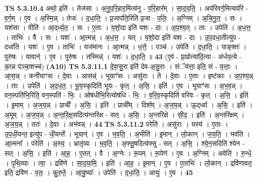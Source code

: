 \documentclass[17pt]{extarticle}
\begin{document}
                  \newline
                                \textbf{ TS 5.3.10.4} \newline
                  अथो॒ इति॑ । तेज॑सा । अ॒नु॒प॒रि॒हार॒मित्य॑नु - प॒रि॒हार᳚म् । सा॒द॒य॒ति॒ । अप॑रिवर्ग॒मित्यप॑रि - व॒र्ग॒म् । ए॒व । अ॒स्मि॒न्न् । तेजः॑ । द॒धा॒ति॒ । प्र॒जाप॑ति॒रिति॑ प्र॒जा - प॒तिः॒ । अ॒ग्निम् । अ॒चि॒नु॒त॒ । सः । यश॑सा । वीति॑ । आ॒द्‌र्ध्य॒त॒ । सः । ए॒ताः । य॒शो॒दा इति॑ यशः - दाः । अ॒प॒श्य॒त् । ताः । उपेति॑ । अ॒ध॒त्त॒ । ताभिः॑ । वै । सः । यशः॑ । आ॒त्मन्न् । अ॒ध॒त्त॒ । यत् । य॒शो॒दा इति॑ यशः - दाः । उ॒प॒दधा॒तीत्यु॑प - दधा॑ति । यशः॑ । ए॒व । ताभिः॑ । यज॑मानः । आ॒त्मन्न् । ध॒त्ते॒ । पञ्च॑ । उपेति॑ । द॒धा॒ति॒ । पाङ्क्तः॑ । पुरु॑षः । यावान्॑ । ए॒व । पुरु॑षः । तस्मिन्न्॑ । यशः॑ । द॒धा॒ति॒ ॥ \textbf{  43} \newline
                  \newline
                      (ए॒वं - प्रा॒प्रोत्या॑दि॒त्या - अ॑र्धय॒त्ये - का॒न्न प॑ञ्चा॒शच्च॑)  \textbf{(A10)} \newline \newline
                                \textbf{ TS 5.3.11.1} \newline
                  दे॒वा॒सु॒रा इति॑ देव-अ॒सु॒राः । संॅय॑त्ता॒ इति॒ सं - य॒त्ताः॒ । आ॒स॒न्न् । कनी॑याꣳसः । दे॒वाः । आसन्न्॑ । भूयाꣳ॑सः । असु॑राः । ते । दे॒वाः । ए॒ताः । इष्ट॑काः । अ॒प॒श्य॒न्न् । ताः । उपेति॑ । अ॒द॒ध॒त॒ । भू॒य॒स्कृदिति॑ भूयः - कृत् । अ॒सि॒ । इति॑ । ए॒व । भूयाꣳ॑सः । अ॒भ॒व॒न्न् । वन॒स्पति॑भि॒रिति॒ वन॒स्पति॑ - भिः॒ । ओष॑धीभि॒रित्योष॑धि - भिः॒ । व॒रि॒व॒स्कृदिति॑ वरिवः - कृत् । अ॒सि॒ । इति॑ । इ॒माम् । अ॒ज॒य॒न्न् । प्राची᳚ । अ॒सि॒ । इति॑ । प्राची᳚म् । दिश᳚म् । अ॒ज॒य॒न्न् । ऊ॒द्‌र्ध्वा । अ॒सि॒ । इति॑ । अ॒मूम् । अ॒ज॒य॒न्न् । अ॒न्त॒रि॒क्ष॒सदित्य॑न्तरिक्ष - सत् । अ॒सि॒ । अ॒न्तरि॑क्षे । सी॒द॒ । इति॑ । अ॒न्तरि॑क्षम् । अ॒ज॒य॒न्न् । ततः॑ । दे॒वाः । अभ॑वन्न् । \textbf{  44} \newline
                  \newline
                                \textbf{ TS 5.3.11.2} \newline
                  परेति॑ । असु॑राः । यस्य॑ । ए॒ताः । उ॒प॒धी॒यन्त॒ इत्यु॑प - धी॒यन्ते᳚ । भूयान्॑ । ए॒व । भ॒व॒ति॒ । अ॒भीति॑ । इ॒मान् । लो॒कान् । ज॒य॒ति॒ । भव॑ति । आ॒त्मना᳚ । परेति॑ । अ॒स्य॒ । भ्रातृ॑व्यः । भ॒व॒ति॒ । अ॒फ्सु॒षदित्य॑फ्सु - सत् । अ॒सि॒ । श्ये॒न॒सदिति॑ श्येन - सत् । अ॒सि॒ । इति॑ । आ॒ह॒ । ए॒तत् । वै । अ॒ग्नेः । रू॒पम् । रू॒पेण॑ । ए॒व । अ॒ग्निम् । अवेति॑ । रु॒न्धे॒ । पृ॒थि॒व्याः । त्वा॒ । द्रवि॑णे । सा॒द॒या॒मि॒ । इति॑ । आ॒ह॒ । इ॒मान् । ए॒व । ए॒ताभिः॑ । लो॒कान् । द्रवि॑णावत॒ इति॒ द्रवि॑ण - व॒तः॒ । कु॒रु॒ते॒ । आ॒यु॒ष्याः᳚ । उपेति॑ । द॒धा॒ति॒ । आयुः॑ । ए॒व । \textbf{  45} \newline
\end{document}
